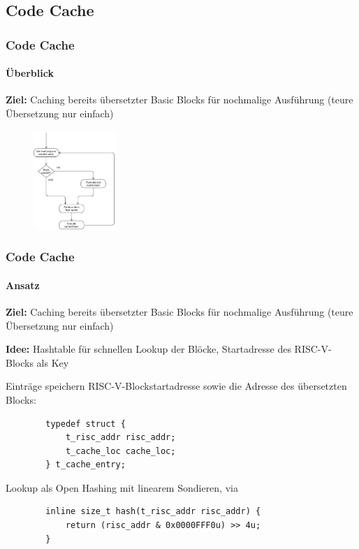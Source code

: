 \documentclass[german]{tum-presentation}
\begin{document}
\subsection{Code Cache} %
\begin{frame}
	\frametitle{Code Cache}
	\framesubtitle{Überblick}
	
	\textbf{Ziel:} Caching bereits übersetzter Basic Blocks für nochmalige Ausführung (teure Übersetzung nur einfach)
	
	\pause
	\begin{figure}
		\includegraphics[width=0.28\textwidth]{diagrams/cache-flow}
	\end{figure}
\end{frame}

\begin{frame}[fragile]
	\frametitle{Code Cache}
	\framesubtitle{Ansatz}
	
	\textbf{Ziel:} Caching bereits übersetzter Basic Blocks für nochmalige Ausführung (teure Übersetzung nur einfach)
	
	\textbf{Idee:} Hashtable für schnellen Lookup der Blöcke, Startadresse des RISC-V-Blocks als Key
	
	\vspace{0.5cm}
	\pause
	Einträge speichern RISC-V-Blockstartadresse sowie die Adresse des übersetzten Blocks:
	\begin{lstlisting}
		typedef struct {
			t_risc_addr risc_addr;
			t_cache_loc cache_loc;
		} t_cache_entry;
	\end{lstlisting}
	
	\pause
	Lookup als Open Hashing mit linearem Sondieren, via
	\begin{lstlisting}
		inline size_t hash(t_risc_addr risc_addr) {
			return (risc_addr & 0x0000FFF0u) >> 4u;
		}
	\end{lstlisting}
\end{frame}
\end{document}
